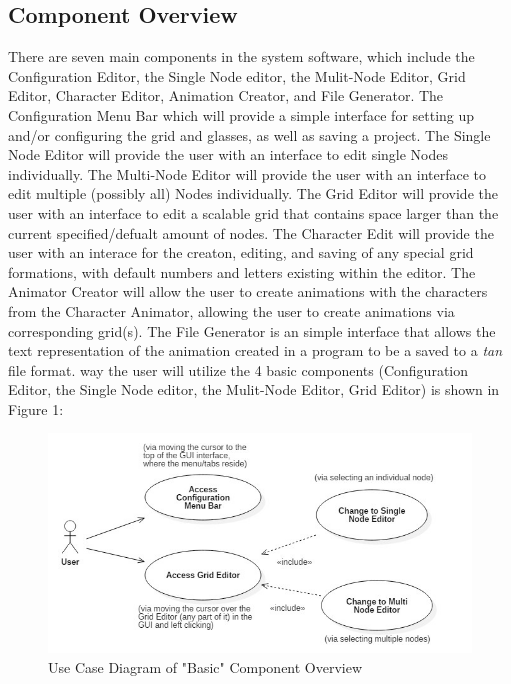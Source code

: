 \documentclass[12pt]{article}
\begin{document}
	\subsection {Component Overview}
	There are seven main components in the system software, which include the Configuration Editor, the Single Node editor, the Mulit-Node Editor, Grid Editor, Character Editor, Animation Creator, and File Generator. The Configuration Menu Bar which will provide a simple interface for setting up and/or configuring the grid and glasses, as well as saving a project. The Single Node Editor will provide the user with an interface to edit single Nodes individually. The Multi-Node Editor will provide the user with an interface to edit multiple (possibly all) Nodes individually. The Grid Editor will provide the user with an interface to edit a scalable grid that contains space larger than the current specified/defualt amount of nodes. The Character Edit will provide the user with an interace for the creaton, editing, and saving of any special grid formations, with default numbers and letters existing within the editor. The Animator Creator will allow the user to create animations with the characters from the Character Animator, allowing the user to create animations via corresponding grid(s). The File Generator is an simple interface that allows the text representation of the animation created in a program to be a saved to a \textit{tan} file format. way the user will utilize the 4 basic components (Configuration Editor, the Single Node editor, the Mulit-Node Editor, Grid Editor) is shown in Figure 1:
	
	\begin{figure}[ht!]
		\centering
		\includegraphics[width=170mm]{ComponetOverview.JPG}
		\caption{Use Case Diagram of "Basic" Component Overview \label{overflow}}
	\end{figure}
	
\end{document}
